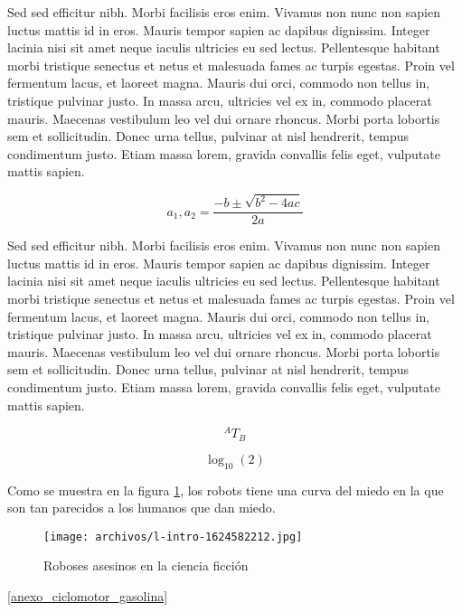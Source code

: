 Sed sed efficitur nibh. Morbi facilisis eros enim. Vivamus non nunc non sapien luctus mattis id in eros. Mauris tempor sapien ac dapibus dignissim. Integer lacinia nisi sit amet neque iaculis ultricies eu sed lectus. Pellentesque habitant morbi tristique senectus et netus et malesuada fames ac turpis egestas. Proin vel fermentum lacus, et laoreet magna. Mauris dui orci, commodo non tellus in, tristique pulvinar justo. In massa arcu, ultricies vel ex in, commodo placerat mauris. Maecenas vestibulum leo vel dui ornare rhoncus. Morbi porta lobortis sem et sollicitudin. Donec urna tellus, pulvinar at nisl hendrerit, tempus condimentum justo. Etiam massa lorem, gravida convallis felis eget, vulputate mattis sapien.

\begin{equation}
    \label{ecuacion_de_van2}
    a_1,a_2 = \frac{-b \pm \sqrt{b^2-4ac}}{2a}
\end{equation}

Sed sed efficitur nibh. Morbi facilisis eros enim. Vivamus non nunc non sapien luctus mattis id in eros. Mauris tempor sapien ac dapibus dignissim. Integer lacinia nisi sit amet neque iaculis ultricies eu sed lectus. Pellentesque habitant morbi tristique senectus et netus et malesuada fames ac turpis egestas. Proin vel fermentum lacus, et laoreet magna. Mauris dui orci, commodo non tellus in, tristique pulvinar justo. In massa arcu, ultricies vel ex in, commodo placerat mauris. Maecenas vestibulum leo vel dui ornare rhoncus. Morbi porta lobortis sem et sollicitudin. Donec urna tellus, pulvinar at nisl hendrerit, tempus condimentum justo. Etiam massa lorem, gravida convallis felis eget, vulputate mattis sapien.

\begin{equation}
    \label{ecuacion_de_van3}
    {}^AT_B
\end{equation}

\begin{equation*}
    \log_{10}(2)
\end{equation*}

Como se muestra en la figura \ref{fig:robots_asesinos}, los robots tiene una curva del miedo en la que son tan parecidos a los humanos que dan miedo.
\begin{figure}[H]
    \centering
    \texttt{[image: archivos/l-intro-1624582212.jpg]}
    \caption{Roboses asesinos en la ciencia ficción}
    \label{fig:robots_asesinos}
\end{figure}


\autoref{anexo_ciclomotor_gasolina}

